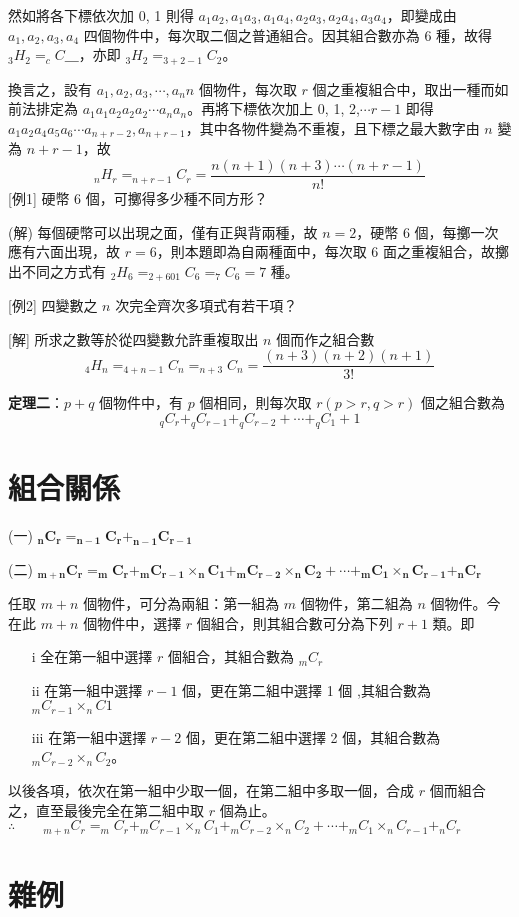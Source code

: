 然如將各下標依次加 0, 1 則得 $a_1a_2,a_1a_3,a_1a_4,a_2a_3,a_2a_4,a_3a_4$，即變成由 $a_1,a_2,a_3,a_4$ 四個物件中，每次取二個之普通組合。因其組合數亦為 6 種，故得 $_3H_2=_cC＿$，亦即 $_3H_2=_{3+2-1}C_2$。

換言之，設有 $a_1,a_2,a_3,\cdots,a_n n$ 個物件，每次取 $r$ 個之重複組合中，取出一種而如前法排定為 $a_1a_1a_2a_2a_2\cdots a_na_n$。再將下標依次加上 0, 1, 2,$\cdots r-1$ 即得 $a_1a_2a_4a_5a_6\cdots a_{n+r-2},a_{n+r-1}$，其中各物件變為不重複，且下標之最大數字由 $n$ 變為 $n+r-1$，故
\begin{equation*}
_nH_r=_{n+r-1}C_r=\dfrac{n(n+1)(n+3)\cdots(n+r-1)}{n!}
\end{equation*}
[例1] 硬幣 6 個，可擲得多少種不同方形？

(解) 每個硬幣可以出現之面，僅有正與背兩種，故 $n=2$，硬幣 6 個，每擲一次應有六面出現，故 $r=6$，則本題即為自兩種面中，每次取 6 面之重複組合，故擲出不同之方式有 $_2H_6=_{2+601}C_6=_7C_6=7$ 種。

[例2] 四變數之 $n$ 次完全齊次多項式有若干項？

[解] 所求之數等於從四變數允許重複取出 $n$ 個而作之組合數
\begin{equation*}
_4H_n=_{4+n-1}C_n=_{n+3}C_n=\dfrac{(n+3)(n+2)(n+1)}{3!}
\end{equation*}

\textbf{定理二}：$p+q$ 個物件中，有 $p$ 個相同，則每次取 $r(p>r,q>r)$ 個之組合數為
\begin{equation*}
_qC_r+_qC_{r-1}+_qC_{r-2}+\cdots+_qC_1+1
\end{equation*}
\section{組合關係}
(一) $\boldsymbol{_nC_r=_{n-1}C_r+_{n-1}C_{r-1}}$ 

(二) $\boldsymbol{_{m+n}C_r=_mC_r+_mC_{r-1}\times _nC_1+_mC_{r-2}\times _nC_2 + \cdots +_mC_1\times _nC_{r-1}+_nC_r}$

任取 $m+n$ 個物件，可分為兩組：第一組為 $m$ 個物件，第二組為 $n$ 個物件。今在此 $m+n$ 個物件中，選擇 $r$ 個組合，則其組合數可分為下列 $r+1$ 類。即
\begin{enumerate}
  \item[i] 全在第一組中選擇 $r$ 個組合，其組合數為 $_mC_r$
  \item[ii] 在第一組中選擇 $r-1$ 個，更在第二組中選擇 1 個 ,其組合數為 $_mC_{r-1}\times _nC1$
  \item[iii] 在第一組中選擇 $r-2$ 個，更在第二組中選擇 2 個，其組合數為 $_mC_{r-2}\times _nC_2$。
\end{enumerate}

以後各項，依次在第一組中少取一個，在第二組中多取一個，合成 $r$ 個而組合之，直至最後完全在第二組中取 $r$ 個為止。
$\therefore\qquad _{m+n}C_r=_mC_r+_mC_{r-1}\times _nC_1+_mC_{r-2}\times _nC_2+\cdots+_mC_1\times _nC_{r-1}+_nC_r$
\section{雜例}
